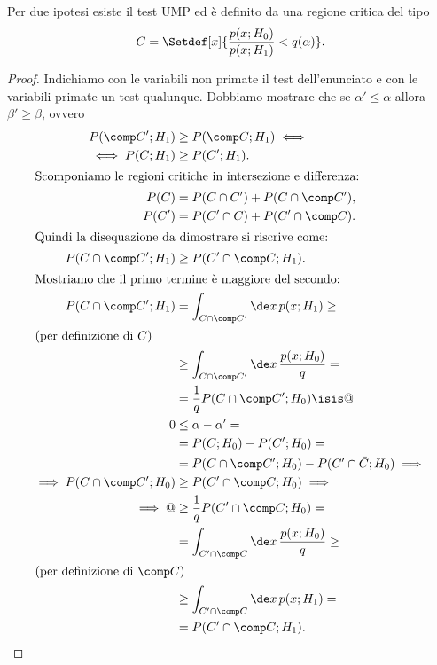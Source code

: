 \begin{theorem}
	\label{th:np}
	Per due ipotesi esiste il test UMP
	ed è definito da una regione critica del tipo
	\begin{equation*}
		C = \Setdef[x]{\frac{p(x;H_0)}{p(x;H_1)} < q(\alpha)}.
	\end{equation*}
\end{theorem}

\begin{proof}
	Indichiamo con le variabili non primate il test dell'enunciato
	e con le variabili primate un test qualunque.
	Dobbiamo mostrare che se $\alpha'\le\alpha$ allora $\beta'\ge\beta$,
	ovvero
	\begin{align*}
		P(\comp C';H_1)
		&\ge P(\comp C;H_1) \iff \\
		\iff P(C;H_1)
		&\ge P(C';H_1). \\
		\intertext{Scomponiamo le regioni critiche in intersezione e differenza:}
		P(C)
		&= P(C\cap C') + P(C\cap\comp C'), \\
		P(C')
		&= P(C'\cap C) + P(C'\cap\comp C). \\
		\intertext{Quindi la disequazione da dimostrare si riscrive come:}
		P(C\cap\comp C';H_1)
		&\ge P(C'\cap\comp C;H_1). \\
		\intertext{Mostriamo che il primo termine è maggiore del secondo:}
		P(C\cap\comp C';H_1)
		&= \int_{C\cap\comp C'} \de x\, p(x;H_1) \ge \\
		\intertext{(per definizione di $C$)}
		&\ge \int_{C\cap\comp C'} \de x\, \frac{p(x;H_0)}q = \\
		&= \frac1q P(C\cap\comp C';H_0) \isis @ \\
		0
		&\le \alpha - \alpha' = \\
		&= P(C;H_0) - P(C';H_0) = \\
		&= P(C\cap\comp C';H_0) - P(C'\cap\bar C;H_0) \implies \\
		\implies P(C\cap\comp C';H_0)
		&\ge P(C'\cap\comp C;H_0) \implies \\
		\implies @
		&\ge \frac1q P(C'\cap\comp C;H_0) = \\
		&= \int_{C'\cap\comp C} \de x\, \frac{p(x;H_0)}q \ge \\
		\intertext{(per definizione di $\comp C$)}
		&\ge \int_{C'\cap\comp C} \de x\, p(x;H_1) = \\
		&= P(C'\cap\comp C;H_1). \qedhere
	\end{align*}
\end{proof}

